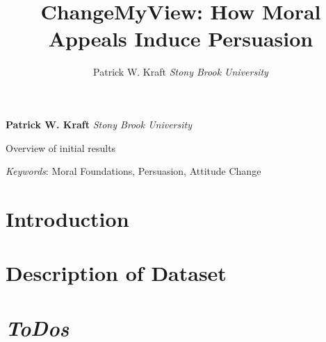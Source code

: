 \documentclass[11pt,]{article}
\title{ChangeMyView: How Moral Appeals Induce Persuasion  }
\author{\Large Patrick W. Kraft\vspace{0.05in} \newline\normalsize\emph{Stony Brook University}  }
\date{}
\newcommand*{\authorfont}{\fontfamily{phv}\selectfont}
\renewenvironment{abstract}
 {{%
    \setlength{\leftmargin}{0mm}
    \setlength{\rightmargin}{\leftmargin}%
  }%
  \relax}
 {\endlist}
\begin{document}
	
%

{%
\setlength{\parindent}{0pt}
\thispagestyle{plain}
{\fontsize{18}{20}\selectfont\raggedright 
\maketitle  %

}

{
   \vskip 13.5pt\relax \normalsize\fontsize{11}{12} 
\textbf{\authorfont Patrick W. Kraft} \hskip 15pt \emph{\small Stony Brook University}   

}

}








\begin{abstract}

    \hbox{\vrule height .2pt width 39.14pc}

    \vskip 8.5pt %

\noindent Overview of initial results


\vskip 8.5pt \noindent \emph{Keywords}: Moral Foundations, Persuasion, Attitude Change \par

    \hbox{\vrule height .2pt width 39.14pc}



\end{abstract}


\vskip 6.5pt


\noindent  \section{Introduction}\label{introduction}

\section{Description of Dataset}\label{description-of-dataset}

\section{\texorpdfstring{\emph{ToDos}}{ToDos}}\label{todos}
\end{document}
